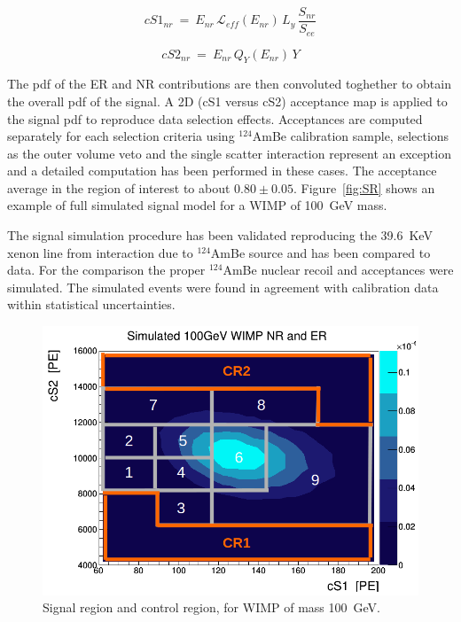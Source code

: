 \begin{equation}
cS1_{nr} ~=~ E_{nr} \, \mathcal{L}_{eff}(E_{nr}) \, L_{y} \, \frac{S_{nr}}{S_{ee}}
\label{f:cs1}
\end{equation}

\begin{equation}
cS2_{nr}  ~ = ~ E_{nr} \, Q_{Y}(E_{nr}) \, Y
\label{f:cs2}
\end{equation}

The pdf of the ER and NR contributions are then convoluted toghether to obtain the overall pdf of the signal.
A 2D (cS1 versus cS2) acceptance map is applied to the signal pdf to reproduce data selection effects. Acceptances are computed separately for each selection 
criteria using $^{124}$AmBe calibration sample, selections as the outer volume veto and the single scatter interaction represent an exception  and 
a detailed computation has been performed in these cases. The acceptance average in the region of interest to about $0.80 \pm 0.05$. 
Figure~\ref{fig:SR} shows an example of full simulated signal model for a WIMP of 100~GeV mass. 

The signal simulation procedure has been validated reproducing the 39.6~KeV xenon line from interaction due to
$^{124}$AmBe source and has been compared to data. For the comparison the proper  $^{124}$AmBe nuclear recoil and acceptances
were simulated. The simulated events were found in agreement  with calibration data within statistical uncertainties.

\begin{figure}[t!]
  \includegraphics[width=\linewidth]{images/wimp_in_sr.png}
  \caption{Signal region and control region, for WIMP of mass 100~GeV.}
  \label{fig:SR2}
\end{figure}


